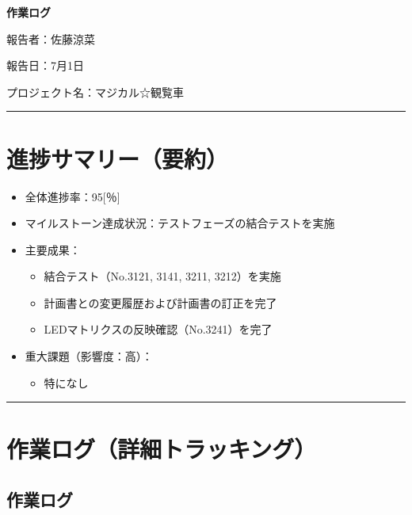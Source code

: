 \documentclass[uplatex,dvipdfmx,a4paper,11pt]{jsarticle}
\newcommand{\sectionrule}{\par\medskip\noindent\rule{\linewidth}{0.6pt}\par\medskip}
\begin{document}
{\LARGE\bfseries 作業ログ}\par\bigskip

報告者：佐藤涼菜

報告日：7月1日

プロジェクト名：マジカル☆観覧車

\sectionrule


\section{進捗サマリー（要約）}

\begin{itemize}
  \item 全体進捗率：95[％]
  \item マイルストーン達成状況：テストフェーズの結合テストを実施
  \item 主要成果：
    \begin{itemize}
      \item {結合テスト（No.3121, 3141, 3211, 3212）を実施}
      \item {計画書との変更履歴および計画書の訂正を完了}
      \item {LEDマトリクスの反映確認（No.3241）を完了}
    \end{itemize}
  \item 重大課題（影響度：高）：
    \begin{itemize}
      \item {特になし}
    \end{itemize}
\end{itemize}

\sectionrule


\section{作業ログ（詳細トラッキング）}

\subsection{作業ログ}

\renewcommand{\arraystretch}{1.2}

\small
\end{document}
